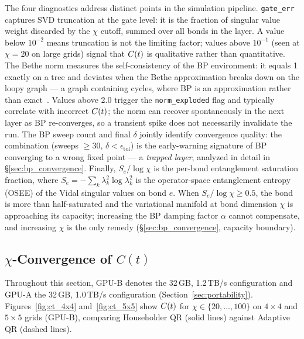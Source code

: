 The four diagnostics address distinct points in the simulation pipeline.
\texttt{gate\_err} captures SVD truncation at the gate level: it is the
fraction of singular value weight discarded by the $\chi$ cutoff, summed
over all bonds in the layer.
A value below $10^{-2}$ means truncation is not the limiting factor;
values above $10^{-1}$ (seen at $\chi=20$ on large grids) signal that
$C(t)$ is qualitative rather than quantitative.
The Bethe norm measures the self-consistency of the BP environment:
it equals 1 exactly on a tree and deviates when the Bethe approximation
breaks down on the loopy graph --- a graph containing cycles, where BP is an
approximation rather than exact~\citep{yedidia2005constructing}.
Values above 2.0 trigger the \texttt{norm\_exploded} flag and typically
correlate with incorrect $C(t)$; the norm can recover spontaneously in the
next layer as BP re-converges, so a transient spike does not necessarily
invalidate the run.
The BP sweep count and final $\delta$ jointly identify convergence quality:
the combination (sweeps $\geq 30$, $\delta < \epsilon_{\mathrm{tol}}$) is the
early-warning signature of BP converging to a wrong fixed point --- a
\emph{trapped layer}, analyzed in detail in \S\ref{sec:bp_convergence}.
Finally, $S_e / \log\chi$ is the per-bond entanglement saturation fraction,
where $S_e = -\sum_k \lambda_k^2 \log\lambda_k^2$ is the operator-space
entanglement entropy (OSEE) of the Vidal singular values on bond $e$.
When $S_e / \log\chi \geq 0.5$, the bond is more than half-saturated and
the variational manifold at bond dimension $\chi$ is approaching its capacity;
increasing the BP damping factor $\alpha$ cannot compensate, and increasing $\chi$ is the only remedy
(\S\ref{sec:bp_convergence}, capacity boundary).

\subsection{$\chi$-Convergence of $C(t)$}
\label{sec:chi_convergence}

Throughout this section, GPU-B denotes the 32\,GB, 1.2\,TB/s configuration
and GPU-A the 32\,GB, 1.0\,TB/s configuration
(Section~\ref{sec:portability}).
Figures~\ref{fig:ct_4x4} and~\ref{fig:ct_5x5} show $C(t)$ for $\chi \in
\{20,\ldots,100\}$ on $4\times4$ and $5\times5$ grids (GPU-B), comparing
Householder QR (solid lines) against Adaptive QR (dashed lines).

